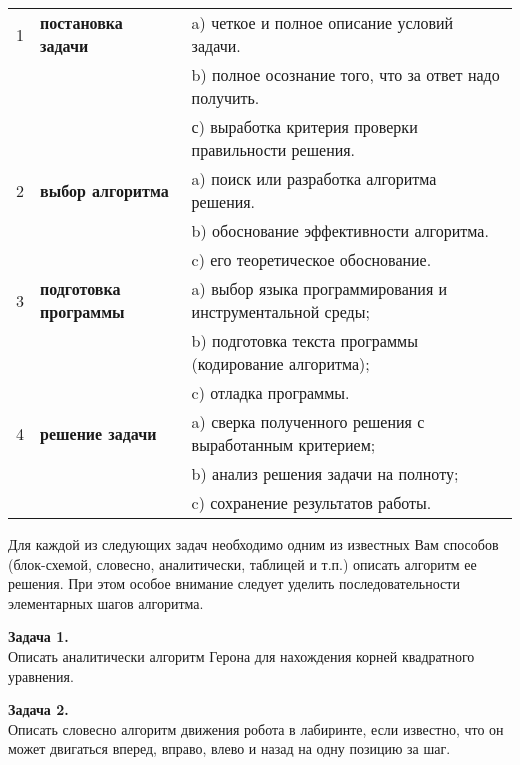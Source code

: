 \begin{tabular}{ | l | l | l | }
\hline
1 & {\bf постановка задачи} & a) четкое и полное описание условий задачи. \\ 
    &                                                  & b) полное осознание того, что за ответ надо получить. \\ 
    &                                                  & с) выработка критерия проверки правильности решения. \\ \hline
2 & {\bf выбор алгоритма}   & a) поиск или разработка алгоритма решения. \\ 
   &                                                  & b) обоснование эффективности алгоритма. \\ 
   &                                                  &c) его теоретическое обоснование.\\ \hline
3 & {\bf подготовка программы} & a) выбор языка программирования и инструментальной среды;  \\ 
   &                                                            &b) подготовка текста программы (кодирование алгоритма);\\ 
   &                                                            &c) отладка программы.\\ \hline
4 & {\bf решение задачи} & a)  сверка полученного решения с выработанным критерием; \\
   &                                              &b) анализ решения задачи на полноту;\\ 
   &                                              &c) сохранение результатов работы.\\ 
\hline
\end{tabular}

\vspace{5mm}
Для каждой из следующих задач необходимо одним из известных Вам способов (блок-схемой, словесно, аналитически, таблицей и т.п.) описать алгоритм ее решения. При этом особое внимание следует уделить последовательности элементарных ша­гов алгоритма.

{\bf Задача 1.}\\ 
Описать аналитически алгоритм Герона для нахождения корней квадратного уравнения.

{\bf Задача 2.}\\ 
Описать словесно алгоритм движения робота в лабиринте, если известно, что он может двигаться вперед, вправо, влево и назад на одну позицию за шаг.

